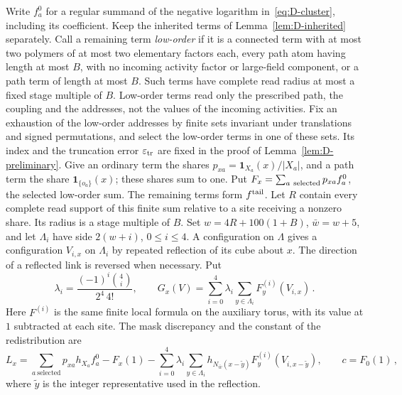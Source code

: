 Write $f_a^0$ for a regular summand of the negative logarithm in~\eqref{eq:D-cluster}, including its coefficient. Keep the inherited terms of Lemma~\ref{lem:D-inherited} separately. Call a remaining term \emph{low-order} if it is a connected term with at most two polymers of at most two elementary factors each, every path atom having length at most $B$, with no incoming activity factor or large-field component, or a path term of length at most $B$. Such terms have complete read radius at most a fixed stage multiple of $B$. Low-order terms read only the prescribed path, the coupling and the addresses, not the values of the incoming activities. Fix an exhaustion of the low-order addresses by finite sets invariant under translations and signed permutations, and select the low-order terms in one of these sets. Its index and the truncation error $\varepsilon_{\rm tr}$ are fixed in the proof of Lemma~\ref{lem:D-preliminary}. Give an ordinary term the shares $p_{xa}=\mathbf1_{X_a}(x)/|X_a|$, and a path term the share $\mathbf1_{\{o_a\}}(x)$; these shares sum to one. Put $F_x=\sum_{a\ {\rm selected}}p_{xa}f_a^0$, the selected low-order sum. The remaining terms form $f^{\rm tail}$. Let $R$ contain every complete read support of this finite sum relative to a site receiving a nonzero share. Its radius is a stage multiple of $B$. Set $w=4R+100(1+B)$, $\bar w=w+5$, and let $\Lambda_i$ have side $2(w+i)$, $0\le i\le4$. A configuration on $\Lambda$ gives a configuration $V_{i,x}$ on $\Lambda_i$ by repeated reflection of its cube about $x$. The direction of a reflected link is reversed when necessary. Put
\begin{equation}\label{eq:D-five-weights}
\lambda_i=\frac{(-1)^i\binom4i}{2^4\,4!},\qquad
G_x(V)=\sum_{i=0}^4\lambda_i\sum_{y\in\Lambda_i}F^{(i)}_y(V_{i,x})\,.
\end{equation}
Here $F^{(i)}$ is the same finite local formula on the auxiliary torus, with its value at $1$ subtracted at each site. The mask discrepancy and the constant of the redistribution are
\begin{equation}\label{eq:D-mask-localization}
L_x=\sum_{a\ \text{selected}}p_{xa}h_{X_a}f_a^0-F_x(1)
-\sum_{i=0}^4\lambda_i\sum_{y\in\Lambda_i}
 h_{N_{\bar w}(x-\widetilde y)}F^{(i)}_y(V_{i,x-\widetilde y}),
\qquad c=F_0(1)\,,
\end{equation}
where $\widetilde y$ is the integer representative used in the reflection.

